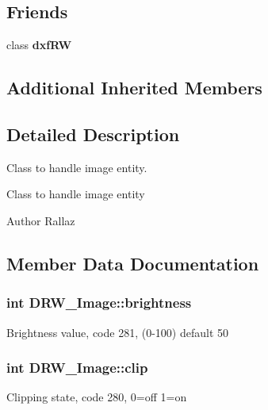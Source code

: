 \subsection*{Friends}
\begin{DoxyCompactItemize}
\item 
\hypertarget{class_d_r_w___image_a7f080e77e5112f8364c61b97387f8ee2}{}class {\bfseries dxf\+R\+W}\label{class_d_r_w___image_a7f080e77e5112f8364c61b97387f8ee2}

\end{DoxyCompactItemize}
\subsection*{Additional Inherited Members}


\subsection{Detailed Description}
Class to handle image entity. 

Class to handle image entity \begin{DoxyAuthor}{Author}
Rallaz 
\end{DoxyAuthor}


\subsection{Member Data Documentation}
\hypertarget{class_d_r_w___image_a7d088d2d2bca24de4e44cfc40e5f30bf}{}
\subsubsection[{brightness}]{\setlength{\rightskip}{0pt plus 5cm}int D\+R\+W\+\_\+\+Image\+::brightness}\label{class_d_r_w___image_a7d088d2d2bca24de4e44cfc40e5f30bf}
Brightness value, code 281, (0-\/100) default 50 \hypertarget{class_d_r_w___image_a8d1f1854dc9b76525aa03fad3b007a58}{}
\subsubsection[{clip}]{\setlength{\rightskip}{0pt plus 5cm}int D\+R\+W\+\_\+\+Image\+::clip}\label{class_d_r_w___image_a8d1f1854dc9b76525aa03fad3b007a58}
Clipping state, code 280, 0=off 1=on \hypertarget{class_d_r_w___image_ad3ba08920ac1d83d073ba1f408cceb09}{}
